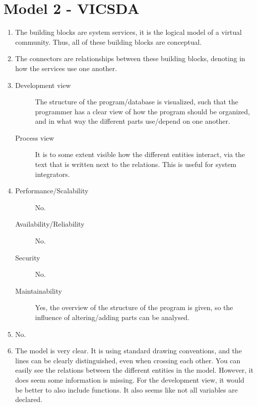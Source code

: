 \section{Model 2 - VICSDA}
\begin{enumerate}
	\item The building blocks are system services, it is the logical model of a virtual community.
	Thus, all of these building blocks are conceptual.
	
	\item The connectors are relationships between these building blocks, denoting in how the services use one another.
	
	\item
	\begin{description}
		\item[Development view] The structure of the program/database is visualized, such that the programmer has a clear view of how the program should be organized, and in what way the different parts use/depend on one another.
		\item[Process view] It is to some extent visible how the different entities interact, via the text that is written next to the relations. This is useful for system integrators.
	\end{description}
	
	\item 
	\begin{description}
		\item[Performance/Scalability] No.
		\item[Availability/Reliability] No.
		\item[Security] No.
		\item[Maintainability] Yes, the overview of the structure of the program is given, so the influence of altering/adding parts can be analysed.
	\end{description}
	
	\item No.
	
	\item The model is very clear. It is using standard drawing conventions, and the lines can be clearly distinguished, even when crossing each other.
	You can easily see the relations between the different entities in the model.
	However, it does seem some information is missing. For the development view, it would be better to also include functions. It also seems like not all variables are declared.
\end{enumerate}
